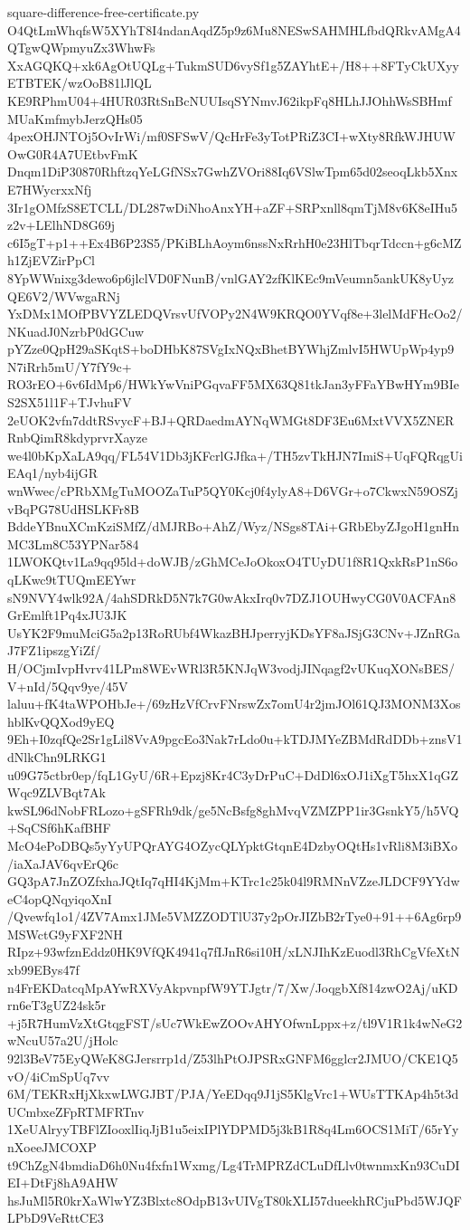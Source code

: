 \documentclass[11pt]{article}
\theoremstyle{definition}
\theoremstyle{remark}
\begin{document}
\begin{filecontents*}[overwrite]{square-difference-free-certificate.py}
O4QtLmWhqfsW5XYhT8I4ndanAqdZ5p9z6Mu8NESwSAHMHLfbdQRkvAMgA4QTgwQWpmyuZx3WhwFs
XxAGQKQ+xk6AgOtUQLg+TukmSUD6vySf1g5ZAYhtE+/H8++8FTyCkUXyyETBTEK/wzOoB81lJlQL
KE9RPhmU04+4HUR03RtSnBcNUUIsqSYNmvJ62ikpFq8HLhJJOhhWsSBHmfMUaKmfmybJerzQHs05
4pexOHJNTOj5OvIrWi/mf0SFSwV/QcHrFe3yTotPRiZ3CI+wXty8RfkWJHUWOwG0R4A7UEtbvFmK
Dnqm1DiP30870RhftzqYeLGfNSx7GwhZVOri88Iq6VSlwTpm65d02seoqLkb5XnxE7HWycrxxNfj
3Ir1gOMfzS8ETCLL/DL287wDiNhoAnxYH+aZF+SRPxnll8qmTjM8v6K8eIHu5z2v+LElhND8G69j
c6I5gT+p1++Ex4B6P23S5/PKiBLhAoym6nssNxRrhH0e23HlTbqrTdccn+g6cMZh1ZjEVZirPpCl
8YpWWnixg3dewo6p6jlclVD0FNunB/vnlGAY2zfKlKEc9mVeumn5ankUK8yUyzQE6V2/WVwgaRNj
YxDMx1MOfPBVYZLEDQVrsvUfVOPy2N4W9KRQO0YVqf8e+3lelMdFHcOo2/NKuadJ0NzrbP0dGCuw
pYZze0QpH29aSKqtS+boDHbK87SVgIxNQxBhetBYWhjZmlvI5HWUpWp4yp9N7iRrh5mU/Y7fY9c+
RO3rEO+6v6IdMp6/HWkYwVniPGqvaFF5MX63Q81tkJan3yFFaYBwHYm9BIeS2SX51l1F+TJvhuFV
2eUOK2vfn7ddtRSvycF+BJ+QRDaedmAYNqWMGt8DF3Eu6MxtVVX5ZNERRnbQimR8kdyprvrXayze
we4l0bKpXaLA9qq/FL54V1Db3jKFcrlGJfka+/TH5zvTkHJN7ImiS+UqFQRqgUiEAq1/nyb4ijGR
wnWwec/cPRbXMgTuMOOZaTuP5QY0Kcj0f4ylyA8+D6VGr+o7CkwxN59OSZjvBqPG78UdHSLKFr8B
BddeYBnuXCmKziSMfZ/dMJRBo+AhZ/Wyz/NSgs8TAi+GRbEbyZJgoH1gnHnMC3Lm8C53YPNar584
1LWOKQtv1La9qq95ld+doWJB/zGhMCeJoOkoxO4TUyDU1f8R1QxkRsP1nS6oqLKwc9tTUQmEEYwr
sN9NVY4wlk92A/4ahSDRkD5N7k7G0wAkxIrq0v7DZJ1OUHwyCG0V0ACFAn8GrEmlft1Pq4xJU3JK
UsYK2F9muMciG5a2p13RoRUbf4WkazBHJperryjKDsYF8aJSjG3CNv+JZnRGaJ7FZ1ipszgYiZf/
H/OCjmIvpHvrv41LPm8WEvWRl3R5KNJqW3vodjJINqagf2vUKuqXONsBES/V+nId/5Qqv9ye/45V
laluu+fK4taWPOHbJe+/69zHzVfCrvFNrswZx7omU4r2jmJOl61QJ3MONM3XoshblKvQQXod9yEQ
9Eh+I0zqfQe2Sr1gLil8VvA9pgcEo3Nak7rLdo0u+kTDJMYeZBMdRdDDb+znsV1dNlkChn9LRKG1
u09G75ctbr0ep/fqL1GyU/6R+Epzj8Kr4C3yDrPuC+DdDl6xOJ1iXgT5hxX1qGZWqc9ZLVBqt7Ak
kwSL96dNobFRLozo+gSFRh9dk/ge5NcBsfg8ghMvqVZMZPP1ir3GsnkY5/h5VQ+SqCSf6hKafBHF
McO4ePoDBQs5yYyUPQrAYG4OZycQLYpktGtqnE4DzbyOQtHs1vRli8M3iBXo/iaXaJAV6qvErQ6c
GQ3pA7JnZOZfxhaJQtIq7qHI4KjMm+KTrc1c25k04l9RMNnVZzeJLDCF9YYdweC4opQNqyiqoXnI
/Qvewfq1o1/4ZV7Amx1JMe5VMZZODTlU37y2pOrJIZbB2rTye0+91++6Ag6rp9MSWctG9yFXF2NH
RIpz+93wfznEddz0HK9VfQK4941q7fIJnR6si10H/xLNJIhKzEuodl3RhCgVfeXtNxb99EBys47f
n4FrEKDatcqMpAYwRXVyAkpvnpfW9YTJgtr/7/Xw/JoqgbXf814zwO2Aj/uKDrn6eT3gUZ24sk5r
+j5R7HumVzXtGtqgFST/sUc7WkEwZOOvAHYOfwnLppx+z/tl9V1R1k4wNeG2wNcuU57a2U/jHolc
92l3BeV75EyQWeK8GJersrrp1d/Z53lhPtOJPSRxGNFM6gglcr2JMUO/CKE1Q5vO/4iCmSpUq7vv
6M/TEKRxHjXkxwLWGJBT/PJA/YeEDqq9J1jS5KlgVrc1+WUsTTKAp4h5t3dUCmbxeZFpRTMFRTnv
1XeUAlryyTBFlZIooxlIiqJjB1u5eixIPlYDPMD5j3kB1R8q4Lm6OCS1MiT/65rYynXoeeJMCOXP
t9ChZgN4bmdiaD6h0Nu4fxfn1Wxmg/Lg4TrMPRZdCLuDfLlv0twnmxKn93CuDIEI+DtFj8hA9AHW
hsJuMl5R0krXaWlwYZ3Blxtc8OdpB13vUIVgT80kXLI57dueekhRCjuPbd5WJQFLPbD9VeRttCE3

\end{filecontents*}
\end{document}
